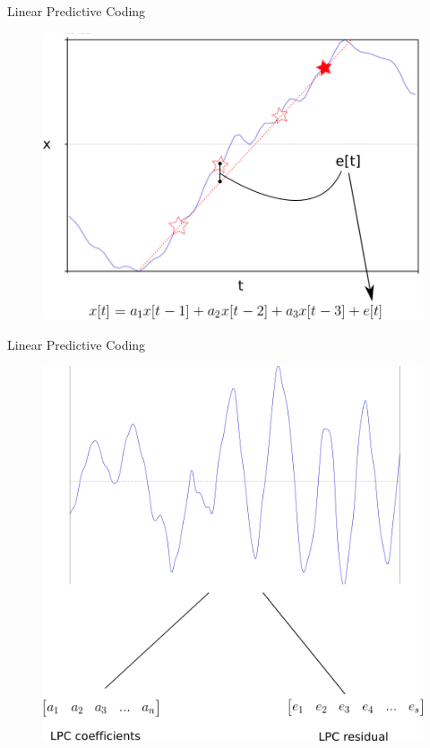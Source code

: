 \documentclass{beamer}
\begin{document}
\begin{frame}
Linear Predictive Coding
\begin{figure}
\includegraphics[scale=0.5]{error.png}
\end{figure}
\end{frame}
\begin{frame}
Linear Predictive Coding
\begin{figure}
\includegraphics[scale=0.5]{encoded_signal.png}
\end{figure}
\end{frame}
\end{document}
